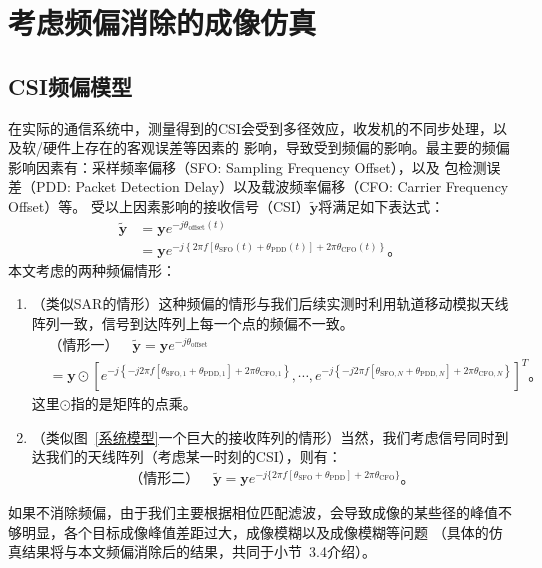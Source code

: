\section{考虑频偏消除的成像仿真}
\subsection{CSI频偏模型}
在实际的通信系统中，测量得到的CSI会受到多径效应，收发机的不同步处理，以及软/硬件上存在的客观误差等因素的
影响，导致受到频偏的影响。最主要的频偏影响因素有：采样频率偏移（SFO: Sampling Frequency Offset），以及
包检测误差（PDD: Packet Detection Delay）以及载波频率偏移（CFO: Carrier Frequency Offset）等\cite{ma2019wifi}\cite{Precise_PDP_WiFi}。
受以上因素影响的接收信号（CSI）$\tilde{\boldsymbol{y}}$将满足如下表达式\cite{zhang2022practical}：
\begin{align}
  \tilde{\boldsymbol{y}} &= \boldsymbol{y}e^{-j\theta_{\text{offset}}(t)} \nonumber 
  \\ &= \boldsymbol{y}e^{-j \left\{2\pi f[\theta_{\text{SFO}}(t)+\theta_{\text{PDD}}(t)]+2\pi \theta_{\text{CFO}}(t)\right\}}
  \text{。}
\end{align}
本文考虑的两种频偏情形：
\begin{enumerate}
  \item （类似SAR的情形）这种频偏的情形与我们后续实测时利用轨道移动模拟天线阵列一致，信号到达阵列上每一个点的频偏不一致。
  \begin{align}
    & \text{（情形一）}\quad \tilde{\boldsymbol{y}} = \boldsymbol{y}e^{-j\theta_{\text{offset}}} \nonumber \\
    &= \boldsymbol{y} \odot \left[e^{-j\left\{-j2\pi f[\theta_{\text{SFO},1}+\theta_{\text{PDD},1}]+2\pi \theta_{\text{CFO},1}\right\}},\cdots,e^{-j\left\{-j2\pi f[\theta_{\text{SFO},N}+\theta_{\text{PDD},N}]+2\pi \theta_{\text{CFO},N}\right\}}\right]^T
    \text{。}
    \label{情形一}
  \end{align}
  这里$\odot$指的是矩阵的点乘。
  \item （类似图~\ref{系统模型}一个巨大的接收阵列的情形）当然，我们考虑信号同时到达我们的天线阵列（考虑某一时刻的CSI），则有：
  \begin{align}
    \text{（情形二）}\quad
    \tilde{\boldsymbol{y}} = \boldsymbol{y}e^{-j\{2\pi f[\theta_{\text{SFO}}+\theta_{\text{PDD}}]+2\pi\theta_{\text{CFO}}\}}
    \text{。}
    \label{情形二}
  \end{align}
\end{enumerate}


如果不消除频偏，由于我们主要根据相位匹配滤波，会导致成像的某些径的峰值不够明显，各个目标成像峰值差距过大，成像模糊以及成像模糊等问题
（具体的仿真结果将与本文频偏消除后的结果，共同于小节~3.4介绍）。
